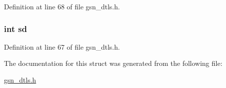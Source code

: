 Definition at line 68 of file gsn\_\-dtls.h.

\hypertarget{a00460_a06b0afe769d54ae94259d8532bc878b0}{
\subsubsection[{sd}]{\setlength{\rightskip}{0pt plus 5cm}int {\bf sd}}}
\label{a00460_a06b0afe769d54ae94259d8532bc878b0}


Definition at line 67 of file gsn\_\-dtls.h.



The documentation for this struct was generated from the following file:\begin{DoxyCompactItemize}
\item 
\hyperlink{a00487}{gsn\_\-dtls.h}\end{DoxyCompactItemize}
